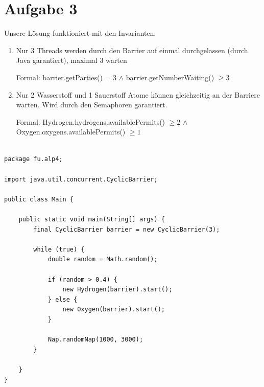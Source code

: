 \section*{Aufgabe 3}

Unsere Lösung funktioniert mit den Invarianten:

\begin{enumerate}

\item Nur 3 Threads werden durch den Barrier auf einmal durchgelassen (durch Java garantiert), maximal 3 warten

Formal: barrier.getParties() = 3 $\land$ barrier.getNumberWaiting() $\geq 3$ \\

\item Nur 2 Wasserstoff und 1 Sauerstoff Atome können gleichzeitig an der Barriere warten. Wird durch den Semaphoren garantiert.
 
Formal: Hydrogen.hydrogens.availablePermits() $\geq 2$ $\land$ Oxygen.oxygens.availablePermits() $\geq 1$

\end{enumerate}

\begin{lstlisting}[style=java]

package fu.alp4;

import java.util.concurrent.CyclicBarrier;

public class Main {

    public static void main(String[] args) {
        final CyclicBarrier barrier = new CyclicBarrier(3);

        while (true) {
            double random = Math.random();

            if (random > 0.4) {
                new Hydrogen(barrier).start();
            } else {
                new Oxygen(barrier).start();
            }

            Nap.randomNap(1000, 3000);
        }

    }
}

\end{lstlisting}

